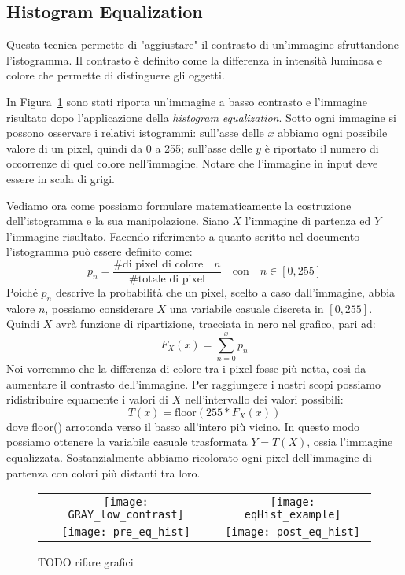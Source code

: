 \clearpage
\subsection {Histogram Equalization}
Questa tecnica permette di "aggiustare" il contrasto di un'immagine sfruttandone l'istogramma.
Il contrasto è definito come la differenza in intensità luminosa e colore che permette di distinguere gli oggetti.

In Figura~\ref{fig:hist_eq_example} sono stati riporta un'immagine a basso contrasto e l'immagine risultato dopo l'applicazione della \textit{histogram equalization}.
Sotto ogni immagine si possono osservare i relativi istogrammi: sull'asse delle $x$ abbiamo ogni possibile valore di un pixel, quindi da 0 a 255; sull'asse delle $y$ è riportato il numero di occorrenze di quel colore nell'immagine.
Notare che l'immagine in input deve essere in scala di grigi.

Vediamo ora come possiamo formulare matematicamente la costruzione dell'istogramma e la sua manipolazione.
Siano $X$ l'immagine di partenza ed $Y$ l'immagine risultato.
Facendo riferimento a quanto scritto nel documento l'istogramma può essere definito come:
\begin{equation*}
p_n = \frac{\text{\# di pixel di colore} \quad n}{\text{\# totale di pixel}} \quad \text{con} \quad n \in [0,255]
\end{equation*}
Poiché $p_n$ descrive la probabilità che un pixel, scelto a caso dall'immagine, abbia valore $n$, possiamo considerare $X$ una variabile casuale discreta in $[0,255]$.
Quindi $X$ avrà funzione di ripartizione, tracciata in nero nel grafico, pari ad:
\begin{equation*}
  F_X(x) = \sum_{n=0}^{x} p_n
\end{equation*}
Noi vorremmo che la differenza di colore tra i pixel fosse più netta, così da aumentare il contrasto dell'immagine.
Per raggiungere i nostri scopi possiamo ridistribuire equamente i valori di $X$ nell'intervallo dei valori possibili:
\begin{equation*}
  T(x) = \text{floor}(255 * F_X(x))
\end{equation*}
dove floor() arrotonda verso il basso all'intero più vicino.
In questo modo possiamo ottenere la variabile casuale trasformata $Y=T(X)$, ossia l'immagine equalizzata.
Sostanzialmente abbiamo ricolorato ogni pixel dell'immagine di partenza con colori più distanti tra loro.

\begin{figure}[ht] %
  \begin{center}
    \begin{tabular}{cc}
      \texttt{[image: GRAY\_low\_contrast]} &
      \texttt{[image: eqHist\_example]} \\
      \texttt{[image: pre\_eq\_hist]} &
      \texttt{[image: post\_eq\_hist]}
    \end{tabular}
    \caption{TODO rifare grafici}
    \label{fig:hist_eq_example}
  \end{center}
\end{figure}


